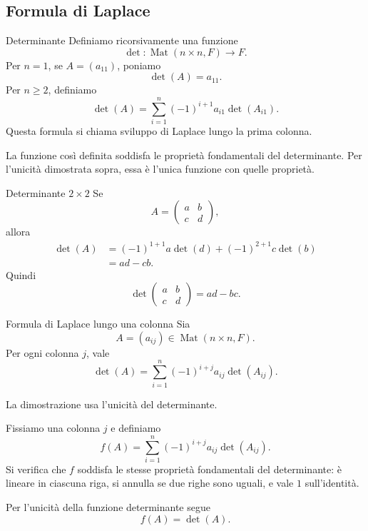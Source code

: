 \documentclass[a4paper]{article}
\begin{document}
\subsection{Formula di Laplace}

\begin{snippetdefinition}{Determinante}
    Definiamo ricorsivamente una funzione
    \[
        \det:\operatorname{Mat}(n\times n,F)\to F.
    \]
    Per \(n=1\), se \(A=(a_{11})\), poniamo
    \[
        \det(A)=a_{11}.
    \]
    Per \(n\geq 2\), definiamo
    \[
        \det(A)
        =
        \sum_{i=1}^{n}
        (-1)^{i+1}a_{i1}\det(A_{i1}).
    \]
    Questa formula si chiama sviluppo di Laplace lungo la prima colonna.
\end{snippetdefinition}

La funzione così definita soddisfa le proprietà fondamentali del determinante. Per l'unicità dimostrata sopra, essa è l'unica funzione con quelle proprietà.

\begin{snippetexample}{Determinante \(2\times 2\)}
    Se
    \[
        A=
        \begin{pmatrix}
            a & b\\
            c & d
        \end{pmatrix},
    \]
    allora
    \begin{align*}
        \det(A)
        &=
        (-1)^{1+1}a\det(d)
        +
        (-1)^{2+1}c\det(b)\\
        &=ad-cb.
    \end{align*}
    Quindi
    \[
        \det
        \begin{pmatrix}
            a & b\\
            c & d
        \end{pmatrix}
        =
        ad-bc.
    \]
\end{snippetexample}

\begin{snippetproposition}{Formula di Laplace lungo una colonna}
    Sia
    \[
        A=(a_{ij})\in\operatorname{Mat}(n\times n,F).
    \]
    Per ogni colonna \(j\), vale
    \[
        \det(A)
        =
        \sum_{i=1}^{n}
        (-1)^{i+j}a_{ij}\det(A_{ij}).
    \]
\end{snippetproposition}

\begin{snippetproof}{}
    La dimostrazione usa l'unicità del determinante.

    Fissiamo una colonna \(j\) e definiamo
    \[
        f(A)
        =
        \sum_{i=1}^{n}
        (-1)^{i+j}a_{ij}\det(A_{ij}).
    \]
    Si verifica che \(f\) soddisfa le stesse proprietà fondamentali del determinante: è lineare in ciascuna riga, si annulla se due righe sono uguali, e vale \(1\) sull'identità.

    Per l'unicità della funzione determinante segue
    \[
        f(A)=\det(A).
    \]
\end{snippetproof}
\end{document}

